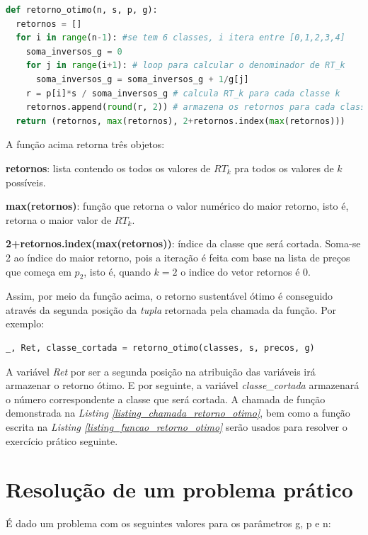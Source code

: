 \documentclass[a4paper, 12pt]{article}
\begin{document}
\begin{lstlisting}[language=Python, caption=Função retorno\_otimo, label=listing_funcao_retorno_otimo]
def retorno_otimo(n, s, p, g):
  retornos = []
  for i in range(n-1): #se tem 6 classes, i itera entre [0,1,2,3,4]
    soma_inversos_g = 0 
    for j in range(i+1): # loop para calcular o denominador de RT_k
      soma_inversos_g = soma_inversos_g + 1/g[j]
    r = p[i]*s / soma_inversos_g # calcula RT_k para cada classe k
    retornos.append(round(r, 2)) # armazena os retornos para cada classe
  return (retornos, max(retornos), 2+retornos.index(max(retornos)))

\end{lstlisting}

A função acima retorna três objetos:\newline

\textbf{retornos}: lista contendo os todos os valores de $RT_k$ pra todos os valores de $k$ possíveis.

\textbf{max(retornos)}: função que retorna o valor numérico do maior retorno, isto é, retorna o maior valor de $RT_k$.

\textbf{2+retornos.index(max(retornos))}: índice da classe que será cortada. Soma-se 2 ao índice do maior retorno, pois a iteração é feita com base na lista de preços que começa em $p_2$, isto é, quando $k=2$ o indice do vetor retornos é $0$.

Assim, por meio da função acima, o retorno sustentável ótimo é conseguido através da segunda posição da \emph{tupla} retornada pela chamada da função. Por exemplo:

\begin{lstlisting}[language=Python, caption=Encontrando o retorno ótimo, label=listing_chamada_retorno_otimo]
_, Ret, classe_cortada = retorno_otimo(classes, s, precos, g)
\end{lstlisting}

A variável \emph{Ret} por ser a segunda posição na atribuição das variáveis irá armazenar o retorno ótimo. E por seguinte, a variável \emph{classe\_cortada} armazenará o número correspondente a classe que será cortada.
A chamada de função demonstrada na \emph{Listing \ref{listing_chamada_retorno_otimo}}, bem como a função escrita na \emph{Listing \ref{listing_funcao_retorno_otimo}} serão usados para resolver o exercício prático seguinte.

\section{Resolução de um problema prático}
É dado um problema com os seguintes valores para os parâmetros g, p e n:
\end{document}
